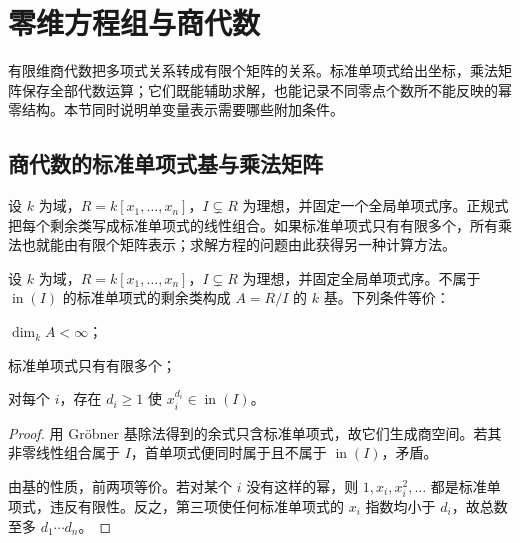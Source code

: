 
\section{零维方程组与商代数}
\label{b3:sec:0805}


有限维商代数把多项式关系转成有限个矩阵的关系。标准单项式给出坐标，乘法矩阵保存全部代数运算；它们既能辅助求解，也能记录不同零点个数所不能反映的幂零结构。本节同时说明单变量表示需要哪些附加条件。

\subsection{商代数的标准单项式基与乘法矩阵}
\label{b3:subsec:0805:01}

设 \(k\) 为域，\(R=k[x_1,\ldots,x_n]\)，\(I\subsetneq R\) 为理想，并固定一个全局单项式序。正规式把每个剩余类写成标准单项式的线性组合。如果标准单项式只有有限多个，所有乘法也就能由有限个矩阵表示；求解方程的问题由此获得另一种计算方法。

\begin{proposition}\label{b3:prop:standard-basis-finite}
	设 \(k\) 为域，\(R=k[x_1,\ldots,x_n]\)，\(I\subsetneq R\) 为理想，并固定全局单项式序。不属于 \(\operatorname{in}(I)\) 的标准单项式的剩余类构成 \(A=R/I\) 的 \(k\) 基。下列条件等价：
	\begin{equivalences}
		\item \(\dim_k A<\infty\)；
		\item 标准单项式只有有限多个；
		\item 对每个 \(i\)，存在 \(d_i\ge1\) 使 \(x_i^{d_i}\in\operatorname{in}(I)\)。
	\end{equivalences}
\end{proposition}
\begin{proof}
	用 Gröbner 基除法得到的余式只含标准单项式，故它们生成商空间。若其非零线性组合属于 \(I\)，首单项式便同时属于且不属于 \(\operatorname{in}(I)\)，矛盾。

	由基的性质，前两项等价。若对某个 \(i\) 没有这样的幂，则 \(1,x_i,x_i^2,\ldots\) 都是标准单项式，违反有限性。反之，第三项使任何标准单项式的 \(x_i\) 指数均小于 \(d_i\)，故总数至多 \(d_1\cdots d_n\)。
\end{proof}

